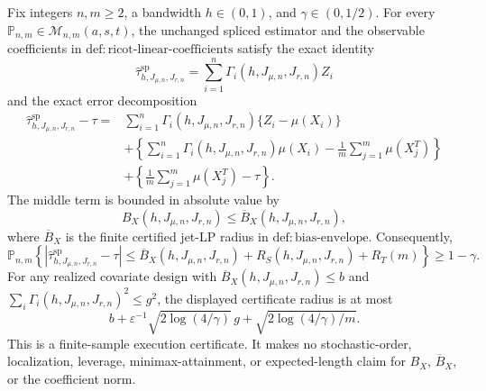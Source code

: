 Fix integers \(n,m\ge2\), a bandwidth \(h\in(0,1)\), and \(\gamma\in(0,1/2)\). For every \(\mathbb P_{n,m}\in\mathcal M_{n,m}(a,s,t)\), the unchanged spliced estimator and the observable coefficients in \(\mathrm{def:ricot\text{-}linear\text{-}coefficients}\) satisfy the exact identity
\[
\widehat\tau^{\mathrm{sp}}_{h,J_{\mu,n},J_{r,n}}=\sum_{i=1}^n\Gamma_i(h,J_{\mu,n},J_{r,n})Z_i
\]
and the exact error decomposition
\[
\begin{aligned}
\widehat\tau^{\mathrm{sp}}_{h,J_{\mu,n},J_{r,n}}-\tau
={}&\sum_{i=1}^n\Gamma_i(h,J_{\mu,n},J_{r,n})\{Z_i-\mu(X_i)\}\\
&+\left\{\sum_{i=1}^n\Gamma_i(h,J_{\mu,n},J_{r,n})\mu(X_i)-\frac1m\sum_{j=1}^m\mu(X_j^T)\right\}\\
&+\left\{\frac1m\sum_{j=1}^m\mu(X_j^T)-\tau\right\}.
\end{aligned}
\]
The middle term is bounded in absolute value by
\[
B_X(h,J_{\mu,n},J_{r,n})\le\overline B_X(h,J_{\mu,n},J_{r,n}),
\]
where \(\overline B_X\) is the finite certified jet-LP radius in \(\mathrm{def:bias\text{-}envelope}\). Consequently,
\[
\mathbb P_{n,m}\!\left\{\left|\widehat\tau^{\mathrm{sp}}_{h,J_{\mu,n},J_{r,n}}-\tau\right|
\le \overline B_X(h,J_{\mu,n},J_{r,n})+R_S(h,J_{\mu,n},J_{r,n})+R_T(m)\right\}\ge1-\gamma.
\]
For any realized covariate design with \(\overline B_X(h,J_{\mu,n},J_{r,n})\le b\) and \(\sum_i\Gamma_i(h,J_{\mu,n},J_{r,n})^2\le g^2\), the displayed certificate radius is at most
\[
b+\varepsilon^{-1}\sqrt{2\log(4/\gamma)}\,g+\sqrt{2\log(4/\gamma)/m}.
\]
This is a finite-sample execution certificate. It makes no stochastic-order, localization, leverage, minimax-attainment, or expected-length claim for \(B_X\), \(\overline B_X\), or the coefficient norm.